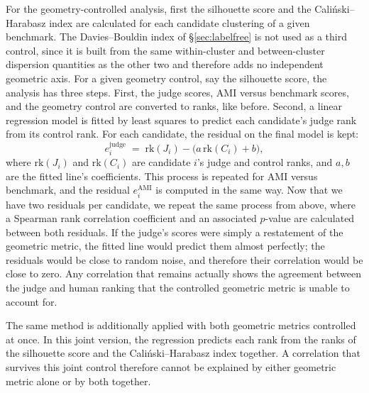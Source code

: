 \documentclass[11pt,a4paper,oneside]{report}
\begin{document}
For the geometry-controlled analysis, first the silhouette score and the Cali\'nski--Harabasz index are calculated for each candidate clustering of a given benchmark. The Davies--Bouldin index of \S\ref{sec:labelfree} is not used as a third control, since it is built from the same within-cluster and between-cluster dispersion quantities as the other two and therefore adds no independent geometric axis. For a given geometry control, say the silhouette score, the analysis has three steps. First, the judge scores, AMI versus benchmark scores, and the geometry control are converted to ranks, like before. Second, a linear regression model is fitted by least squares to predict each candidate's judge rank from its control rank. For each candidate, the residual on the final model is kept:
\[
e_i^{\mathrm{judge}} \;=\; \mathrm{rk}(J_i) - \bigl(a\,\mathrm{rk}(C_i) +b\bigr),
\]
where $\mathrm{rk}(J_i)$ and $\mathrm{rk}(C_i)$ are candidate $i$'s judge and control ranks, and $a, b$ are the fitted line's coefficients. This process is repeated for AMI versus benchmark, and the residual $e_i^{\mathrm{AMI}}$ is computed in the same way. Now that we have two residuals per candidate, we repeat the same process from above, where a Spearman rank correlation coefficient and an associated $p$-value are calculated between both residuals. If the judge's scores were simply a restatement of the geometric metric, the fitted line would predict them almost perfectly; the residuals would be close to random noise, and therefore their correlation would be close to zero. Any correlation that remains actually shows the agreement between the judge and human ranking that the controlled geometric metric is unable to account for.

The same method is additionally applied with both geometric metrics controlled at once. In this joint version, the regression predicts each rank from the ranks of the silhouette score and the Cali\'nski--Harabasz index together. A correlation that survives this joint control therefore cannot be explained by either geometric metric alone or by both together.
\end{document}
